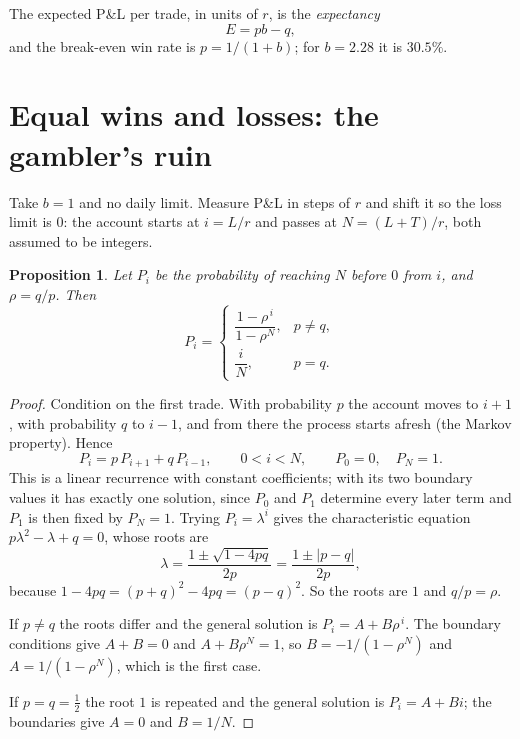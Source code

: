 \documentclass[11pt,a4paper]{article}
\newtheorem{proposition}{Proposition}
\begin{document}
The expected P\&L per trade, in units of $r$, is the \emph{expectancy}
\[
  E = p b - q,
\]
and the break-even win rate is $p = 1/(1+b)$; for $b = 2.28$ it is $30.5\%$.

\section{Equal wins and losses: the gambler's ruin}

Take $b = 1$ and no daily limit. Measure P\&L in steps of $r$ and shift it so the loss
limit is $0$: the account starts at $i = L/r$ and passes at $N = (L+T)/r$, both assumed
to be integers.

\begin{proposition}\label{prop:ruin}
Let $P_i$ be the probability of reaching $N$ before $0$ from $i$, and $\rho = q/p$. Then
\[
  P_i =
  \begin{cases}
    \dfrac{1-\rho^{\,i}}{1-\rho^{N}}, & p \neq q,\\[1.2em]
    \dfrac{i}{N}, & p = q.
  \end{cases}
\]
\end{proposition}

\begin{proof}
Condition on the first trade. With probability $p$ the account moves to $i+1$, with
probability $q$ to $i-1$, and from there the process starts afresh (the Markov
property). Hence
\begin{equation}\label{eq:rec}
  P_i = p\,P_{i+1} + q\,P_{i-1}, \qquad 0 < i < N, \qquad P_0 = 0,\quad P_N = 1.
\end{equation}
This is a linear recurrence with constant coefficients; with its two boundary values
it has exactly one solution, since $P_0$ and $P_1$ determine every later term and
$P_1$ is then fixed by $P_N = 1$. Trying $P_i = \lambda^i$ gives the
characteristic equation $p\lambda^2 - \lambda + q = 0$, whose roots are
\[
  \lambda = \frac{1 \pm \sqrt{1-4pq}}{2p} = \frac{1 \pm |p-q|}{2p},
\]
because $1 - 4pq = (p+q)^2 - 4pq = (p-q)^2$. So the roots are $1$ and $q/p = \rho$.

If $p \neq q$ the roots differ and the general solution is $P_i = A + B\rho^{\,i}$. The
boundary conditions give $A + B = 0$ and $A + B\rho^{N} = 1$, so $B = -1/(1-\rho^N)$ and
$A = 1/(1-\rho^N)$, which is the first case.

If $p = q = \tfrac12$ the root $1$ is repeated and the general solution is
$P_i = A + B i$; the boundaries give $A = 0$ and $B = 1/N$.
\end{proof}
\end{document}
